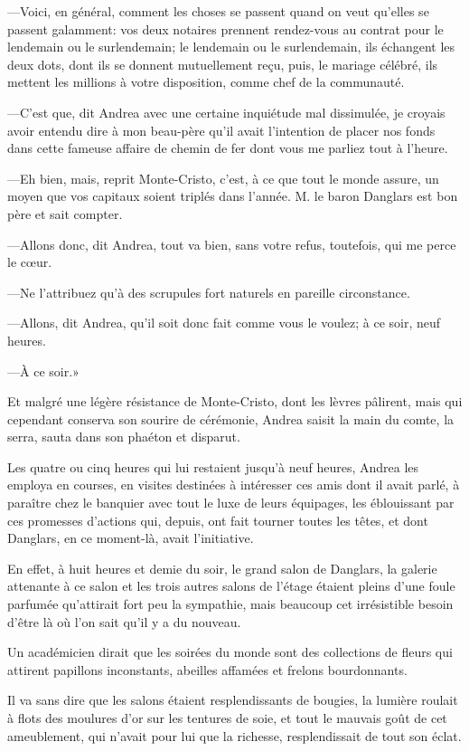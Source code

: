 —Voici, en général, comment les choses se passent quand on veut qu'elles se passent galamment: vos deux notaires prennent rendez-vous au contrat pour le lendemain ou le surlendemain; le lendemain ou le surlendemain, ils échangent les deux dots, dont ils se donnent mutuellement reçu, puis, le mariage célébré, ils mettent les millions à votre disposition, comme chef de la communauté. 

—C'est que, dit Andrea avec une certaine inquiétude mal dissimulée, je croyais avoir entendu dire à mon beau-père qu'il avait l'intention de placer nos fonds dans cette fameuse affaire de chemin de fer dont vous me parliez tout à l'heure. 

—Eh bien, mais, reprit Monte-Cristo, c'est, à ce que tout le monde assure, un moyen que vos capitaux soient triplés dans l'année. M. le baron Danglars est bon père et sait compter. 

—Allons donc, dit Andrea, tout va bien, sans votre refus, toutefois, qui me perce le cœur. 

—Ne l'attribuez qu'à des scrupules fort naturels en pareille circonstance. 

—Allons, dit Andrea, qu'il soit donc fait comme vous le voulez; à ce soir, neuf heures. 

—À ce soir.» 

Et malgré une légère résistance de Monte-Cristo, dont les lèvres pâlirent, mais qui cependant conserva son sourire de cérémonie, Andrea saisit la main du comte, la serra, sauta dans son phaéton et disparut. 

Les quatre ou cinq heures qui lui restaient jusqu'à neuf heures, Andrea les employa en courses, en visites destinées à intéresser ces amis dont il avait parlé, à paraître chez le banquier avec tout le luxe de leurs équipages, les éblouissant par ces promesses d'actions qui, depuis, ont fait tourner toutes les têtes, et dont Danglars, en ce moment-là, avait l'initiative. 

En effet, à huit heures et demie du soir, le grand salon de Danglars, la galerie attenante à ce salon et les trois autres salons de l'étage étaient pleins d'une foule parfumée qu'attirait fort peu la sympathie, mais beaucoup cet irrésistible besoin d'être là où l'on sait qu'il y a du nouveau. 

Un académicien dirait que les soirées du monde sont des collections de fleurs qui attirent papillons inconstants, abeilles affamées et frelons bourdonnants. 

Il va sans dire que les salons étaient resplendissants de bougies, la lumière roulait à flots des moulures d'or sur les tentures de soie, et tout le mauvais goût de cet ameublement, qui n'avait pour lui que la richesse, resplendissait de tout son éclat. 

